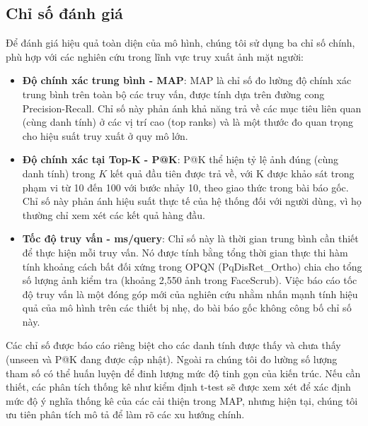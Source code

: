 \subsection{Chỉ số đánh giá}
Để đánh giá hiệu quả toàn diện của mô hình, chúng tôi sử dụng ba chỉ số chính, phù hợp với các nghiên cứu trong lĩnh vực truy xuất ảnh mặt người:
\begin{itemize}
    \item \textbf{Độ chính xác trung bình - MAP}: MAP là chỉ số đo lường độ chính xác trung bình trên toàn bộ các truy vấn, được tính dựa trên đường cong Precision-Recall. Chỉ số này phản ánh khả năng trả về các mục tiêu liên quan (cùng danh tính) ở các vị trí cao (top ranks) và là một thước đo quan trọng cho hiệu suất truy xuất ở quy mô lớn.
    \item \textbf{Độ chính xác tại Top-K - P@K}: P@K thể hiện tỷ lệ ảnh đúng (cùng danh tính) trong $K$ kết quả đầu tiên được trả về, với K được khảo sát trong phạm vi từ 10 đến 100 với bước nhảy 10, theo giao thức trong bài báo gốc. Chỉ số này phản ánh hiệu suất thực tế của hệ thống đối với người dùng, vì họ thường chỉ xem xét các kết quả hàng đầu.
    \item \textbf{Tốc độ truy vấn - ms/query}: Chỉ số này là thời gian trung bình cần thiết để thực hiện mỗi truy vấn. Nó được tính bằng tổng thời gian thực thi hàm tính khoảng cách bất đối xứng trong OPQN (PqDisRet\_Ortho) chia cho tổng số lượng ảnh kiểm tra (khoảng 2,550 ảnh trong FaceScrub). Việc báo cáo tốc độ truy vấn là một đóng góp mới của nghiên cứu nhằm nhấn mạnh tính hiệu quả của mô hình trên các thiết bị nhẹ, do bài báo gốc không công bố chỉ số này.
\end{itemize}

Các chỉ số được báo cáo riêng biệt cho các danh tính được thấy và chưa thấy (unseen và P@K đang được cập nhật). Ngoài ra chúng tôi đo lường số lượng tham số có thể huấn luyện để đinh lượng mức độ tinh gọn của kiến trúc. Nếu cần thiết, các phân tích thống kê như kiểm định t-test sẽ được xem xét để xác định mức độ ý nghĩa thống kê của các cải thiện trong MAP, nhưng hiện tại, chúng tôi ưu tiên phân tích mô tả để làm rõ các xu hướng chính.

